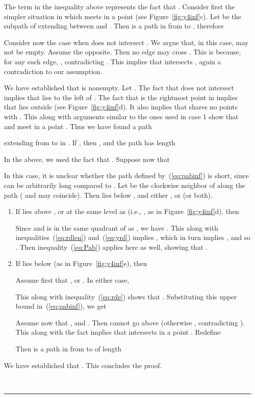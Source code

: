 \pdfoutput=1  \documentclass[11pt]{article}
\newcommand{\qed}{\rule{0.5em}{1.5ex}}
\newcommand{\fqed}{{\hfill~\qed}}
\newenvironment{proof}{{\noindent \bf Proof.}}
                      {{\hfill \fqed} \vspace{1em}}
\begin{document}
\begin{proof}
The term  in the inequality above represents the fact that
.
Consider first the simpler situation in which  meets  in a
point  (see Figure~\ref{fig:y4inf}c).
Let  be the subpath of  extending between  and .
Then  is a path in  from  to ,
therefore


Consider now the case when  does not intersect . We argue that, in this
case,  may not be empty. Assume the opposite. Then
no edge  may cross . This is because,
for any such edge, , contradicting
. This implies that  intersects , again
a contradiction to our assumption.

We have established that  is nonempty. Let .
The fact that  does not intersect  implies that 
lies to the left of .
The fact that  is the rightmost point in  implies that
 lies outside  (see Figure~\ref{fig:y4inf}d). It also implies that
 shares no points with . This along with
arguments similar to the ones used in case 1 show that
 and  meet in a point .
Thus we have found a path

extending from  to  in . If , then
, and the path  has length

In the above, we used the fact that
.
Suppose now that

In this case, it is unclear whether the path  defined by~(\ref{eq:pabinf}) is short,
since  can be arbitrarily long compared to . Let  be the clockwise
neighbor of  along the path  ( and  may coincide).
Then  lies below , and either , or  (or both).
\begin{enumerate}
\item
If  lies above , or at the same level as  (i.e., , as in Figure~\ref{fig:y4inf}d), then

Since  and  is in the same quadrant of  as , we have
. This along with inequalities~(\ref{eq:rdlen})
and~(\ref{eq:yrd}) implies , which in turn
implies , and so
.
Then inequality~(\ref{eq:Pab}) applies here
as well, showing that .

\item
If  lies below  (as in Figure~\ref{fig:y4inf}e), then

Assume first that , or . In either case,

This along with inequality~(\ref{eq:rde}) shows that .
Substituting this upper bound in~(\ref{eq:pabinf}), we get

Assume now that , and . Then
 cannot go above  (otherwise ,
contradicting ). This along with the fact  implies
that  intersects  in a point . Redefine

Then  is a path in  from  to  of length


\end{enumerate}
We have established that .
This concludes the proof.
\end{proof}
\end{document}
